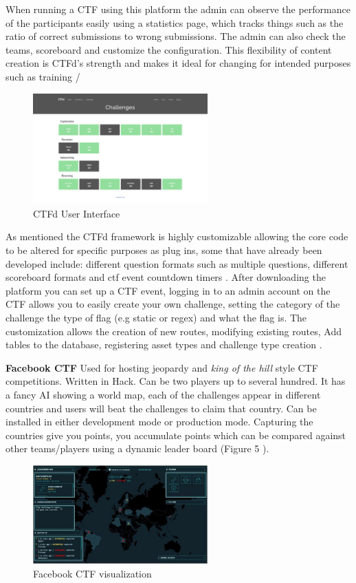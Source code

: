 \documentclass[12pt,a4paper]{article}
\begin{document}
When running a CTF using this platform the admin can observe the performance of the participants easily using a statistics page, which tracks things such as the ratio of correct submissions to wrong submissions. The admin can also check the teams, scoreboard and customize the configuration. This flexibility of content creation is CTFd's strength and makes it ideal for changing for intended purposes such as training \cite{noor2018usability} 
/
\begin{figure}[h]
    \centering
    \includegraphics[width=0.6\textwidth]{Figs/ctfd.png} 
    \caption{CTFd User Interface}
\end{figure} 

As mentioned the CTFd framework is highly customizable allowing the core code to be altered for specific purposes as plug ins, some that have already been developed include: different question formats such as multiple questions, different scoreboard formats and ctf event countdown timers \cite{ctfdplugin}. After downloading the platform you can set up a CTF event, logging in to an admin account on the CTF allows you to easily create your own challenge, setting the category of the challenge the type of flag (e.g static or regex) and what the flag is. The customization allows the creation of new routes, modifying existing routes, Add tables to the database, registering asset types and challenge type creation \cite{ctfdplugin2}.     


\textbf{Facebook CTF} 
Used for hosting jeopardy and \emph{king of the hill} style CTF competitions. Written in Hack. Can be two players up to several hundred. It has a fancy AI showing a world map, each of the challenges appear in different countries and users will beat the challenges to claim that country. Can be installed in either development mode or production mode. Capturing the countries give you points, you accumulate points which can be compared against other teams/players using a dynamic leader board (Figure 5 \cite{fbctf}).  

\begin{figure}[h]
    \centering
    \includegraphics[width=0.6\textwidth]{Figs/fbctf.jpg} 
    \caption{Facebook CTF visualization}
\end{figure}   
\end{document}
